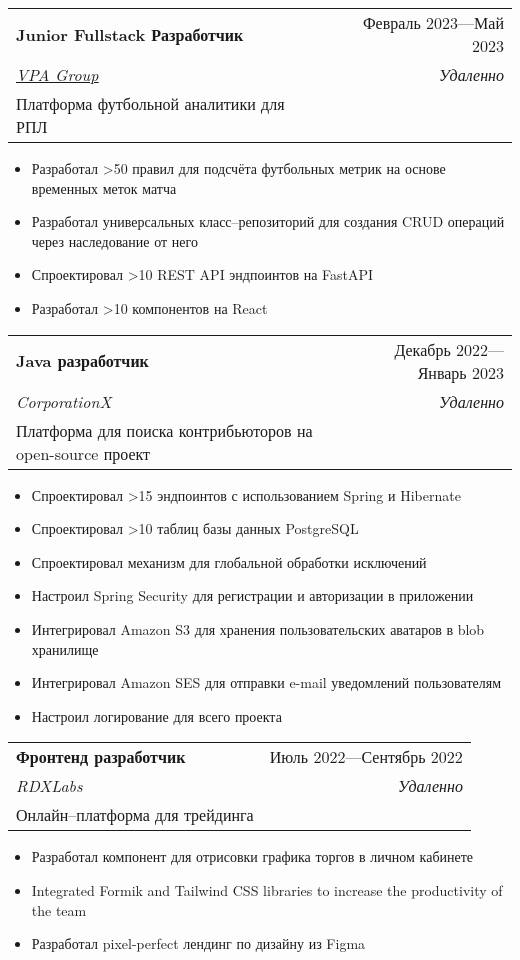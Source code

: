 \documentclass[letterpaper,11pt]{article}
\makeatletter
\newcommand{\resumeItem}[1]{
  \item\small{
    {#1 \vspace{-2pt}}
  }
}
\newcommand{\resumeSubheading}[5]{
  \vspace{-2pt}\item
    \begin{tabular*}{0.97\textwidth}[t]{l@{\extracolsep{\fill}}r}
      \textbf{#1} & #2 \\
      \textit{\small#3} & \textit{\small #4} \\
      \small#5
    \end{tabular*}\vspace{-7pt}
}
\newcommand{\resumeSubSubheading}[2]{
    \item
    \begin{tabular*}{0.97\textwidth}{l@{\extracolsep{\fill}}r}
      \textit{\small#1} & \textit{\small #2} \\
    \end{tabular*}\vspace{-7pt}
}
\newcommand{\resumeSubHeadingListEnd}{\end{itemize}}
\newcommand{\resumeItemListStart}{\begin{itemize}}
\newcommand{\resumeItemListEnd}{\end{itemize}\vspace{-5pt}}
\makeatother
\begin{document}
  \resumeSubheading
      {Junior Fullstack Разработчик}{Февраль 2023—Май 2023}
      {\href{https://vpa.group}{\underline{VPA Group}}}{Удаленно}
      {Платформа футбольной аналитики для РПЛ}
      
      \resumeItemListStart
        \resumeItem{Разработал >50 правил для подсчёта футбольных метрик на основе временных меток матча}
        \resumeItem{Разработал универсальных класс–репозиторий для создания CRUD операций через наследование от него}
        \resumeItem{Спроектировал >10 REST API эндпоинтов на FastAPI}
        \resumeItem{Разработал >10 компонентов на React}
      \resumeItemListEnd

  \resumeSubheading
      {Java разработчик}{Декабрь 2022—Январь 2023}
      {CorporationX}{Удаленно}
      {Платформа для поиска контрибьюторов на open-source проект}
      
      \resumeItemListStart
        \resumeItem{Спроектировал >15 эндпоинтов с использованием Spring и Hibernate}
        \resumeItem{Спроектировал >10 таблиц базы данных PostgreSQL}
        \resumeItem{Спроектировал механизм для глобальной обработки исключений}
        \resumeItem{Настроил Spring Security для регистрации и авторизации в приложении}
        \resumeItem{Интегрировал Amazon S3 для хранения пользовательских аватаров в blob хранилище}
        \resumeItem{Интегрировал Amazon SES для отправки e-mail уведомлений пользователям}
        \resumeItem{Настроил логирование для всего проекта}
      \resumeItemListEnd

    \resumeSubheading
      {Фронтенд разработчик}{Июль 2022—Сентябрь 2022}
      {RDXLabs}{Удаленно}
      {Онлайн–платформа для трейдинга}
      
      \resumeItemListStart
        \resumeItem{Разработал компонент для отрисовки графика торгов в личном кабинете}
        \resumeItem{Integrated Formik and Tailwind CSS libraries to increase the productivity of the team}
        \resumeItem{Разработал pixel-perfect лендинг по дизайну из Figma}
      \resumeItemListEnd
      

\end{document}
